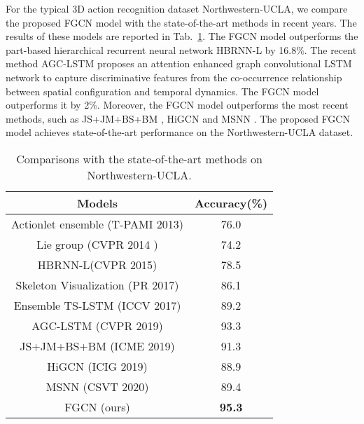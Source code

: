 \documentclass[runningheads]{llncs}
\begin{document}
For the typical 3D action recognition dataset Northwestern-UCLA, we compare the proposed FGCN model with the state-of-the-art methods in recent years. The results of these models are reported in Tab.~\ref{tab-state-ucla}. The FGCN model outperforms the part-based hierarchical recurrent neural network HBRNN-L \cite{du2015hierarchical} by 16.8\%. The recent method AGC-LSTM proposes an attention enhanced graph convolutional LSTM network to capture discriminative features from the co-occurrence relationship between spatial configuration and temporal dynamics. The FGCN model outperforms it by 2\%. Moreover, the FGCN model outperforms the most recent methods, such as JS+JM+BS+BM \cite{li2019learning}, HiGCN \cite{huang2019hierarchical} and MSNN \cite{shao2020learning}. The proposed FGCN model achieves state-of-the-art performance on the Northwestern-UCLA dataset.



\begin{table}[t]
	\caption{Comparisons with the state-of-the-art methods on Northwestern-UCLA.}
	\label{tab-state-ucla}
	\tabcolsep=10pt
	\centering
	\begin{tabular}{cc}
		\hline
		Models & Accuracy(\%) \\
		\hline
		Actionlet ensemble (T-PAMI 2013) \cite{wang2013learning}	&76.0 \\	
		Lie group (CVPR 2014 ) \cite{vemulapalli2014human}	&74.2 \\
		HBRNN-L(CVPR 2015) \cite{du2015hierarchical}	&78.5 \\
		Skeleton Visualization (PR 2017) \cite{liu2017enhanced}	&86.1 \\
		Ensemble TS-LSTM (ICCV 2017) \cite{lee2017ensemble}	&89.2 \\
		AGC-LSTM (CVPR 2019) \cite{si2019attention}	&93.3 \\
		JS+JM+BS+BM (ICME 2019) \cite{li2019learning} & 91.3 \\
		HiGCN (ICIG 2019) \cite{huang2019hierarchical} & 88.9 \\
		MSNN (CSVT 2020) \cite{shao2020learning} & 89.4 \\
		\hline
		FGCN (ours)	&\textbf{95.3} \\
		\hline
	\end{tabular}
\end{table}

\vspace{-1mm}
\end{document}
